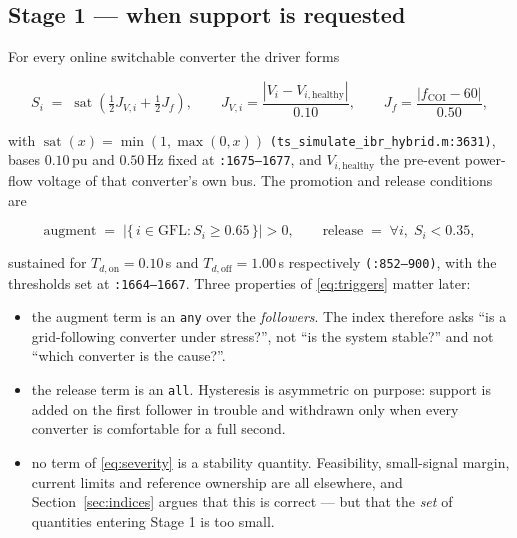 \documentclass[12pt,a4paper]{article}
\theoremstyle{remark}
\newcommand{\pu}{\,\mathrm{pu}}
\newcommand{\Ssev}{S}
\newcommand{\code}[1]{\texttt{\small #1}}
\begin{document}
\subsection{Stage 1 --- when support is requested}

For every online switchable converter the driver forms

\begin{equation}
\Ssev_i \;=\; \operatorname{sat}\!\left(\tfrac{1}{2}J_{V,i} + \tfrac{1}{2}J_f\right),
\qquad
J_{V,i} = \frac{|V_i - V_{i,\text{healthy}}|}{0.10},
\qquad
J_f = \frac{|f_{\mathrm{COI}} - 60|}{0.50},
\label{eq:severity}
\end{equation}

with $\operatorname{sat}(x) = \min(1,\max(0,x))$
\code{(ts\_simulate\_ibr\_hybrid.m:3631)}, bases $0.10\pu$ and $0.50$\,Hz fixed at
\code{:1675--1677}, and $V_{i,\text{healthy}}$ the pre-event power-flow voltage
of that converter's own bus. The promotion and release conditions are

\begin{equation}
\text{augment} \;=\; \bigl|\{\,i \in \text{GFL} : \Ssev_i \ge 0.65\,\}\bigr| > 0,
\qquad
\text{release} \;=\; \forall i,\; \Ssev_i < 0.35,
\label{eq:triggers}
\end{equation}

sustained for $T_{d,\mathrm{on}} = 0.10$\,s and $T_{d,\mathrm{off}} = 1.00$\,s
respectively \code{(:852--900)}, with the thresholds set at \code{:1664--1667}.
Three properties of \eqref{eq:triggers} matter later:

\begin{itemize}[leftmargin=1.4em,itemsep=1pt]
\item the augment term is an \code{any} over the \emph{followers}. The index
      therefore asks ``is a grid-following converter under stress?'', not ``is
      the system stable?'' and not ``which converter is the cause?''.
\item the release term is an \code{all}. Hysteresis is asymmetric on purpose:
      support is added on the first follower in trouble and withdrawn only when
      every converter is comfortable for a full second.
\item no term of \eqref{eq:severity} is a stability quantity. Feasibility,
      small-signal margin, current limits and reference ownership are all
      elsewhere, and Section~\ref{sec:indices} argues that this is correct ---
      but that the \emph{set} of quantities entering Stage 1 is too small.
\end{itemize}
\end{document}
